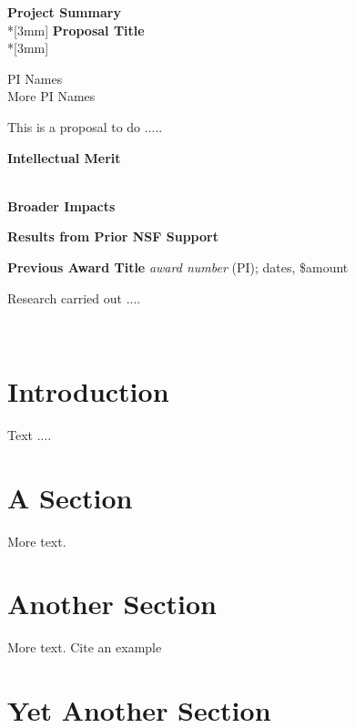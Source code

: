 \documentclass{proposalnsf}
\begin{document}
\begin{center}
{\Large{\bf Project Summary}}\\*[3mm]
{\bf Proposal Title} \\*[3mm]

PI Names \\
More PI Names

\end{center}


This is a  proposal to do .....



\noindent
{\bf Intellectual Merit}

\ \\

\noindent
{\bf Broader Impacts}

\renewcommand{\thepage} {B--\arabic{page}}

\newpage


\renewcommand{\thepage} {D--\arabic{page}}

\newpage

\centerline{\bf Results from Prior NSF Support}

\noindent
{\bf Previous Award Title}
{\it award number} (PI); dates, \$amount

Research carried out ....

\ \\


\section{Introduction}

Text ....

\section{A Section}

More text.

\section{Another Section}

More text.  Cite an example \cite[]{sample_ref}

\section{Yet Another Section}
\end{document}
